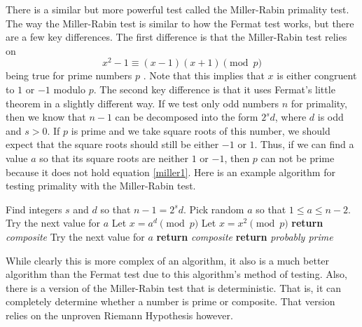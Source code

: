 \documentclass[11pt]{article}
\begin{document}
There is a similar but more powerful test
called the Miller-Rabin primality test.
The way the Miller-Rabin test is similar to how the Fermat test works,
but there are a few key differences.
The first difference is that the Miller-Rabin test relies on
\begin{equation}
    x^2 -1 \equiv (x-1)(x+1) \pmod{p} \label{miller1}
\end{equation}
being true for prime numbers $p$ \cite{Miller}.
Note that this implies that $x$ is either congruent to $1$ or $-1$ modulo $p$.
The second key difference is that it uses Fermat's little theorem in a slightly
different way.
If we test only odd numbers $n$ for primality, then we know that $n-1$ can be
decomposed into the form $2^sd$, where $d$ is odd and $s >0$.
If $p$ is prime and we take square roots of this number, we should expect that
the square roots should still be either $-1$ or $1$.
Thus, if we can find a value $a$ so that its square roots are neither $1$ or $-1$,
then $p$ can not be prime because it does not hold equation \eqref{miller1}.
Here is an example algorithm for testing primality with the Miller-Rabin test.

\begin{algorithm}[H]
\begin{algorithmic}[0]
    \State Find integers $s$ and $d$ so that $n-1 = 2^sd$.
        \State Pick random $a$ so that $1 \le a \le n-2$.
            \State Try the next value for $a$
        \EndIf
        \State Let $x = a^d \pmod{p}$
            \State Let $x = x^2 \pmod{p}$ 
                \State \textbf{return} \emph{composite}
                \State Try the next value for $a$
            \EndIf
        \EndFor
        \State \textbf{return} \emph{composite}
    \EndFor
    \State \textbf{return} \emph{probably prime}
    \EndProcedure
\end{algorithmic}
\end{algorithm}

While clearly this is more complex of an algorithm, it also is a much
better algorithm than the Fermat test due to this algorithm's method of testing.
Also, there is a version of the Miller-Rabin test that is deterministic.
That is, it can completely determine whether a number is prime or composite.
That version relies on the unproven Riemann Hypothesis however.
\end{document}
